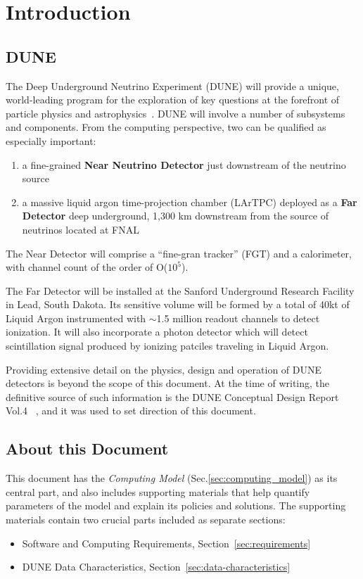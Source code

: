 \section{Introduction}
\subsection{DUNE}

The Deep Underground Neutrino Experiment (DUNE) will provide a unique, world-leading program
for the exploration of key questions at the forefront of particle physics and astrophysics~\cite{sciopps}.
DUNE will involve a number of subsystems and components. From the computing perspective, two can be
qualified as especially important:

\begin{enumerate}

\item a fine-grained \textbf{Near Neutrino Detector} just downstream of the neutrino source
\item a massive liquid argon time-projection chamber (LArTPC) deployed as a \textbf{Far
Detector} deep underground, 1,300 km downstream from the source of neutrinos located at FNAL

\end{enumerate}

The Near Detector will comprise a ``fine-gran tracker'' (FGT) and a calorimeter, with channel count of the order of O($10^{5}$).

The Far Detector will be installed at the Sanford Underground Research Facility in Lead, South Dakota.
Its sensitive volume will be formed by a total of 40kt of Liquid Argon instrumented with $\sim$1.5 million readout
channels to detect ionization. It will also incorporate a photon detector which will detect scintillation
signal produced by ionizing patciles traveling in Liquid Argon.

Providing extensive detail on the physics, design and operation of DUNE detectors  is beyond the scope of this document.
At the time of writing, the definitive source of such information is the DUNE Conceptual Design Report Vol.4 ~\cite{cdr_vol4_docdb}, and 
it was used to set direction of this document.


\subsection{About this Document}
\label{sec:modelrole}

This document has the \textit{Computing Model} (Sec.\ref{sec:computing_model}) as its central part, and also
includes supporting materials that help quantify parameters of the model and explain its policies and
solutions. The supporting materials contain two crucial parts included as separate sections:
\begin{itemize}
\item Software and Computing Requirements, Section~\ref{sec:requirements}
\item DUNE Data Characteristics, Section~\ref{sec:data-characteristics}
\end{itemize}

